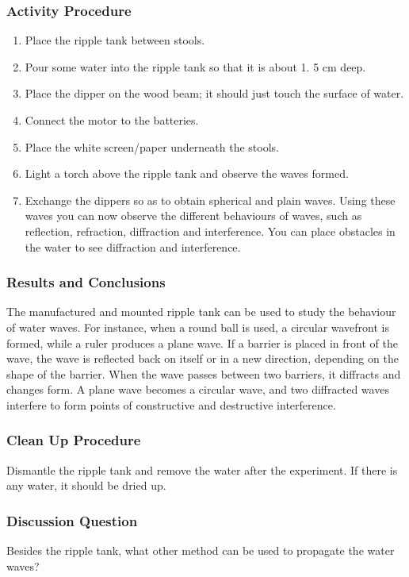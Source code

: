 \subsubsection*{Activity Procedure}
\begin{enumerate}
\item{Place the ripple tank between stools.} 
\item{Pour some water into the ripple tank so that it is about 1.  5 cm deep.} 
\item{Place the dipper on the wood beam; it should just touch the surface of water.} 
\item{Connect the motor to the batteries.} 
\item{Place the white screen/paper underneath the stools.} 
\item{Light a torch above the ripple tank and observe the waves formed.} 
\item{Exchange the dippers so as to obtain spherical and plain waves. Using these waves you can now observe the different behaviours of waves, such as reflection, refraction, diffraction and interference. You can place obstacles in the water to see diffraction and interference.} 
\end{enumerate}

\subsubsection*{Results and Conclusions}
The manufactured and mounted ripple tank can be used to study the behaviour of water waves.  For instance, when a round ball is used, a circular wavefront is formed, while a ruler produces a plane wave.  If a barrier is placed in front of the wave, the wave is reflected back on itself or in a new direction, depending on the shape of the barrier.  When the wave passes between two barriers, it diffracts and changes form.  A plane wave becomes a circular wave, and two diffracted waves interfere to form points of constructive and destructive interference.

\subsubsection*{Clean Up Procedure}
Dismantle the ripple tank and remove the water after the experiment. If there is any water, it should be dried up.

\subsubsection*{Discussion Question}
Besides the ripple tank, what other method can be used to propagate the water waves?

